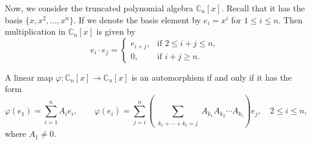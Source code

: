 \documentclass{jonasart}
\begin{document}
	Now, we consider the truncated polynomial algebra $\mathbb{C}_n [x].$
	Recall that it has the basis $\{x, x^2, \dots, x^{n}\}$. If we denote the basis element by $e_i =x^i $ for $1 \le i \le n$. Then multiplication in $\mathbb{C}_n [x]$ is given by
	\begin{equation}\label{mu_0}
		e_i \cdot e_j =
		\begin{cases}
			e_{i+j}, & \text{if } 2 \le i+j \le n, \\
			0, & \text{if } i+j \ge n.
		\end{cases}
	\end{equation}

	\begin{theorem}\label{3.1}
        A linear map $\varphi: \mathbb{C}_n [x] \to \mathbb{C}_n [x]$ is an automorphism if and only if it has the form
		\begin{equation}\label{Aut}
			\varphi(e_1 )=\sum_{i=1}^n A_i e_i,
			\qquad
			\varphi(e_i ) = \sum_{j=i}^n \left( \sum_{\substack{k_1 +\cdots+k_i =j}} A_{k_1} A_{k_2} \cdots A_{k_i} \right) e_j, \quad 2 \le i \le n,
		\end{equation}
		where $A_1 \ne 0.$
	\end{theorem}
\end{document}
